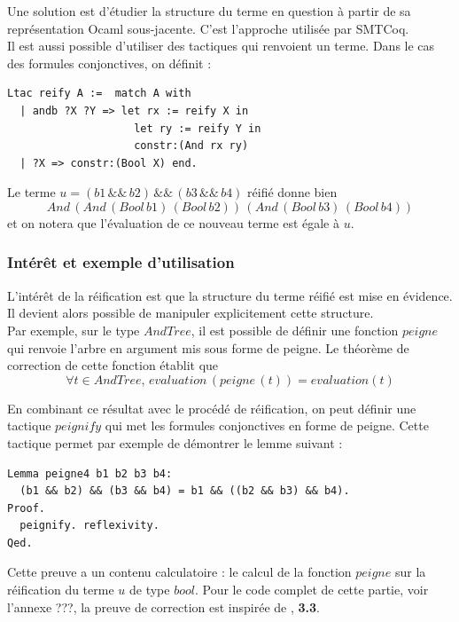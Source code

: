 \documentclass[11pt]{article}
\begin{document}
Une solution est d'étudier la structure du terme en question à partir de sa représentation Ocaml sous-jacente. C'est l'approche utilisée par SMTCoq. \\

Il est aussi possible d'utiliser des tactiques qui renvoient un terme. Dans le cas des formules conjonctives, on définit :

\begin{lstlisting}[frame=single]
Ltac reify A :=  match A with
  | andb ?X ?Y => let rx := reify X in
                    let ry := reify Y in
                    constr:(And rx ry)
  | ?X => constr:(Bool X) end.

\end{lstlisting}

Le terme $u = (b1\,\&\&\,b2)\,\&\&\,(b3\,\&\&\,b4)$ réifié donne bien 
\[And\,(And\,(Bool\,b1)\,(Bool\,b2))\,(And\,(Bool\,b3)\,(Bool\,b4))\] 
et on notera que l'évaluation de ce nouveau terme est égale à $u$.



\subsubsection{Intérêt et exemple d'utilisation}

L'intérêt de la réification est que la structure du terme réifié est mise en évidence. Il devient alors possible de manipuler explicitement cette structure. \\

Par exemple, sur le type $AndTree$, il est possible de définir une fonction $peigne$ qui renvoie l'arbre en argument mis sous forme de peigne. Le théorème de correction de cette fonction établit que 
\[ \forall t \in AndTree, \, evaluation \, (peigne \, (t)) = evaluation (t) \]

En combinant ce résultat avec le procédé de réification, on peut définir une tactique $peignify$ qui met les formules conjonctives en forme de peigne. Cette tactique permet par exemple de démontrer le lemme suivant : 

\begin{lstlisting}[frame=single]
Lemma peigne4 b1 b2 b3 b4:
  (b1 && b2) && (b3 && b4) = b1 && ((b2 && b3) && b4).
Proof.
  peignify. reflexivity.
Qed.
\end{lstlisting}
Cette preuve a un contenu calculatoire : le calcul de la fonction $peigne$ sur la réification du terme $u$ de type $bool$. Pour le code complet de cette partie, voir l'annexe ???, la preuve de correction est inspirée de \cite{coq_intro}, \textbf{3.3}.
\end{document}
